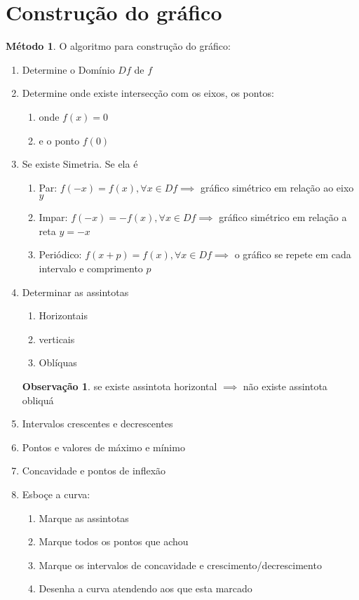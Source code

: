 \documentclass[14pt]{extreport}
\theoremstyle{definition}
\newtheorem*{remark}{Observação}
\newtheorem{method}{Método}
\begin{document}
\section{Construção do gráfico}


\begin{method}
    O algoritmo para construção do gráfico:
    \begin{enumerate}
        \item Determine o Domínio \(Df\) de \(f\)
        \item Determine onde existe intersecção com os eixos, os pontos:
            \begin{enumerate}
                \item onde \(f(x) = 0\)
                \item e o ponto \(f(0)\)
            \end{enumerate}
        \item Se existe Simetria.  Se ela é
            \begin{enumerate}
                \item Par: \(f(-x) = f(x), \forall x \in Df \implies\) gráfico simétrico em relação ao eixo \(y\)
                \item Impar: \(f(-x) = -f(x), \forall x \in Df \implies\) gráfico simétrico em relação a reta \(y = -x\)
                \item Periódico: \(f(x + p) = f(x), \forall x \in Df \implies\) o gráfico se repete em cada intervalo e comprimento \(p\) 
            \end{enumerate}
        \item Determinar as assintotas
            \begin{enumerate}
                \item Horizontais
                \item verticais
                \item Oblíquas
            \end{enumerate}
            \begin{remark}
                se existe assintota horizontal \(\implies\) não existe assintota obliquá
            \end{remark}
        \item Intervalos crescentes e decrescentes
        \item Pontos e valores de máximo e mínimo
        \item Concavidade e pontos de inflexão
        \item Esboçe a curva:
            \begin{enumerate}
                \item Marque as assintotas
                \item Marque todos os pontos que achou
                \item Marque os intervalos de concavidade e crescimento/decrescimento
                \item Desenha a curva atendendo aos que esta marcado
            \end{enumerate}
            

\end{enumerate}
\end{method}
\end{document}
